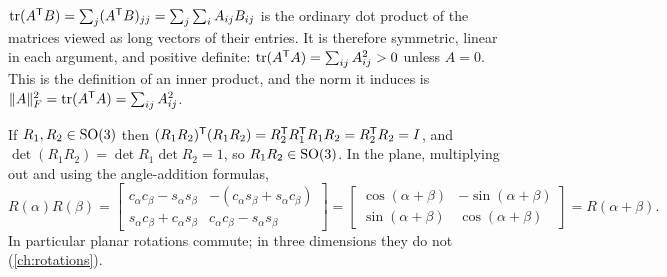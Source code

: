 \begin{solutions}
  \item $\operatorname{tr}(A^{\mathsf{T}} B) = \sum_j(A^{\mathsf{T}} B)_{jj} = \sum_j\sum_iA_{ij}B_{ij}$ is the ordinary dot product of the matrices viewed as long
        vectors of their entries. It is therefore symmetric, linear in each argument, and positive definite:
        $\operatorname{tr}(A^{\mathsf{T}} A) = \sum_{ij}A_{ij}^2 > 0$ unless $A = 0$. This is the definition of an inner product, and the norm it induces is
        $\|A\|_F^2 = \operatorname{tr}(A^{\mathsf{T}} A) = \sum_{ij}A_{ij}^2$.

  \item If $R_1, R_2 \in \mathrm{SO}(3)$ then $(R_1R_2)^{\mathsf{T}}(R_1R_2) = R_2^{\mathsf{T}} R_1^{\mathsf{T}} R_1R_2 = R_2^{\mathsf{T}} R_2 = I$, and
        $\det(R_1R_2) = \det R_1\det R_2 = 1$, so $R_1R_2 \in \mathrm{SO}(3)$. In the plane, multiplying out and using the angle-addition
        formulas,
        \[
          R(\alpha)R(\beta) = \begin{bmatrix} c_\alpha c_\beta - s_\alpha s_\beta & -(c_\alpha s_\beta + s_\alpha c_\beta) \\
                                            s_\alpha c_\beta + c_\alpha s_\beta & c_\alpha c_\beta - s_\alpha s_\beta \end{bmatrix}
          = \begin{bmatrix} \cos(\alpha+\beta) & -\sin(\alpha+\beta) \\ \sin(\alpha+\beta) & \cos(\alpha+\beta) \end{bmatrix} = R(\alpha + \beta).
        \]
        In particular planar rotations commute; in three dimensions they do not (\cref{ch:rotations}).
\end{solutions}
